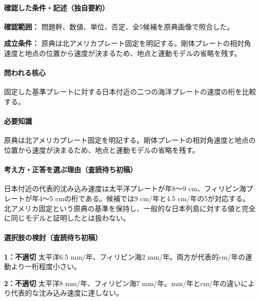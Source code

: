 \paragraph{確認した条件・記述（独自要約）}\mbox{}\par

\noindent\textbf{確認範囲：} 問題幹、数値、単位、否定、全5候補を原典画像で照合した。\par

\noindent\textbf{成立条件：} 原典は北アメリカプレート固定を明記する。剛体プレートの相対角速度と地点の位置から速度が決まるため、地点と運動モデルの省略を残す。\par

\paragraph{問われる核心} 固定した基準プレートに対する日本付近の二つの海洋プレートの速度の桁を比較する。

\paragraph{必要知識} 原典は北アメリカプレート固定を明記する。剛体プレートの相対角速度と地点の位置から速度が決まるため、地点と運動モデルの省略を残す。

\paragraph{考え方・正答を選ぶ理由（査読待ち初稿）} 日本付近の代表的沈み込み速度は太平洋プレートが年8〜9 cm、フィリピン海プレートが年4〜5 cmの桁である。候補では9 cm/年と4.5 cm/年の5が対応する。北アメリカ固定という原典の基準を保持し、一般的な日本列島に対する値と完全に同じモデルと証明したとは扱わない。

\paragraph{選択肢の検討（査読待ち初稿）}\mbox{}\par

\noindent\textbf{1：不適切} 太平洋6.5 mm/年、フィリピン海2 mm/年。両方が代表的cm/年の運動より一桁程度小さい。\par

\noindent\textbf{2：不適切} 太平洋8 mm/年、フィリピン海7 mm/年。mm/年とcm/年の違いにより代表的な沈み込み速度に達しない。\par


